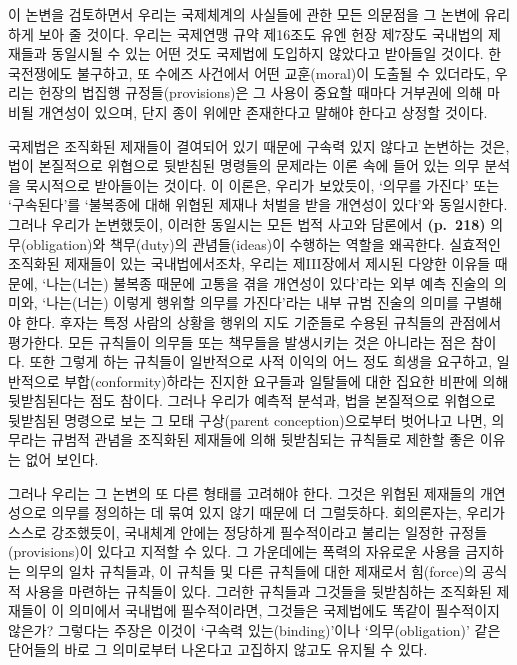 이 논변을 검토하면서 우리는 국제체계의 사실들에 관한 모든 의문점을 그
논변에 유리하게 보아 줄 것이다. 우리는 국제연맹 규약 제16조도 유엔 헌장
제7장도 국내법의 제재들과 동일시될 수 있는 어떤 것도 국제법에 도입하지
않았다고 받아들일 것이다. 한국전쟁에도 불구하고, 또 수에즈 사건에서 어떤
교훈(moral)이 도출될 수 있더라도, 우리는 헌장의 법집행
규정들(provisions)은 그 사용이 중요할 때마다 거부권에 의해 마비될
개연성이 있으며, 단지 종이 위에만 존재한다고 말해야 한다고 상정할
것이다.

국제법은 조직화된 제재들이 결여되어 있기 때문에 구속력 있지 않다고
논변하는 것은, 법이 본질적으로 위협으로 뒷받침된 명령들의 문제라는 이론
속에 들어 있는 의무 분석을 묵시적으로 받아들이는 것이다. 이 이론은,
우리가 보았듯이, ‘의무를 가진다’ 또는 ‘구속된다’를 ‘불복종에 대해 위협된
제재나 처벌을 받을 개연성이 있다’와 동일시한다. 그러나 우리가
논변했듯이, 이러한 동일시는 모든 법적 사고와 담론에서 \textbf{(p.~218)}
의무(obligation)와 책무(duty)의 관념들(ideas)이 수행하는 역할을
왜곡한다. 실효적인 조직화된 제재들이 있는 국내법에서조차, 우리는
제III장에서 제시된 다양한 이유들 때문에, ‘나는(너는) 불복종 때문에
고통을 겪을 개연성이 있다’라는 외부 예측 진술의 의미와, ‘나는(너는)
이렇게 행위할 의무를 가진다’라는 내부 규범 진술의 의미를 구별해야 한다.
후자는 특정 사람의 상황을 행위의 지도 기준들로 수용된 규칙들의 관점에서
평가한다. 모든 규칙들이 의무들 또는 책무들을 발생시키는 것은 아니라는
점은 참이다. 또한 그렇게 하는 규칙들이 일반적으로 사적 이익의 어느 정도
희생을 요구하고, 일반적으로 부합(conformity)하라는 진지한 요구들과
일탈들에 대한 집요한 비판에 의해 뒷받침된다는 점도 참이다. 그러나 우리가
예측적 분석과, 법을 본질적으로 위협으로 뒷받침된 명령으로 보는 그 모태
구상(parent conception)으로부터 벗어나고 나면, 의무라는 규범적 관념을
조직화된 제재들에 의해 뒷받침되는 규칙들로 제한할 좋은 이유는 없어
보인다.

그러나 우리는 그 논변의 또 다른 형태를 고려해야 한다. 그것은 위협된
제재들의 개연성으로 의무를 정의하는 데 묶여 있지 않기 때문에 더
그럴듯하다. 회의론자는, 우리가 스스로 강조했듯이, 국내체계 안에는
정당하게 필수적이라고 불리는 일정한 규정들(provisions)이 있다고 지적할
수 있다. 그 가운데에는 폭력의 자유로운 사용을 금지하는 의무의 일차
규칙들과, 이 규칙들 및 다른 규칙들에 대한 제재로서 힘(force)의 공식적
사용을 마련하는 규칙들이 있다. 그러한 규칙들과 그것들을 뒷받침하는
조직화된 제재들이 이 의미에서 국내법에 필수적이라면, 그것들은 국제법에도
똑같이 필수적이지 않은가? 그렇다는 주장은 이것이 ‘구속력
있는(binding)’이나 ‘의무(obligation)’ 같은 단어들의 바로 그 의미로부터
나온다고 고집하지 않고도 유지될 수 있다.

